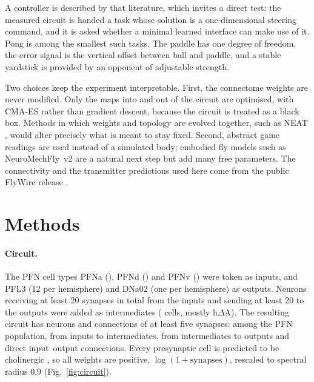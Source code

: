 \documentclass[11pt]{article}
\begin{document}
A controller is described by that literature, which invites a direct test: the measured circuit is
handed a task whose solution is a one-dimensional steering command, and it is asked whether a minimal
learned interface can make use of it. Pong is among the smallest such tasks. The paddle has one
degree of freedom, the error signal is the vertical offset between ball and paddle, and a stable
yardstick is provided by an opponent of adjustable strength.

Two choices keep the experiment interpretable. First, the connectome weights are never modified. Only
the maps into and out of the circuit are optimised, with CMA-ES \cite{hansen2001} rather than
gradient descent, because the circuit is treated as a black box. Methods in which weights and
topology are evolved together, such as NEAT \cite{stanley2002}, would alter precisely what is meant
to stay fixed. Second, abstract game readings are used instead of a simulated body; embodied fly
models such as NeuroMechFly~v2 \cite{wangchen2024} are a natural next step but add many free
parameters. The connectivity and the transmitter predictions used here come from the public FlyWire
release \cite{dorkenwald2024, eckstein2024}.

\section{Methods}

\paragraph{Circuit.}
The PFN cell types PFNa (\NPFNa{}), PFNd (\NPFNd{}) and PFNv (\NPFNv{}) were taken as inputs, and
PFL3 (12 per hemisphere) and DNa02 (one per hemisphere) as outputs. Neurons receiving at least 20
synapses in total from the inputs and sending at least 20 to the outputs were added as intermediates
(\Intermediates{} cells, mostly h$\Delta$A). The resulting circuit has \Neurons{} neurons and
\Edges{} connections of at least five synapses: \EdgesWithinInputs{} among the PFN population,
\EdgesInMid{} from inputs to intermediates, \EdgesMidOut{} from intermediates to outputs and
\EdgesDirect{} direct input--output connections. Every presynaptic cell is predicted to be
cholinergic \cite{eckstein2024}, so all weights are positive, $\log(1+\text{synapses})$, rescaled to
spectral radius $0.9$ (Fig.~\ref{fig:circuit}).
\end{document}
